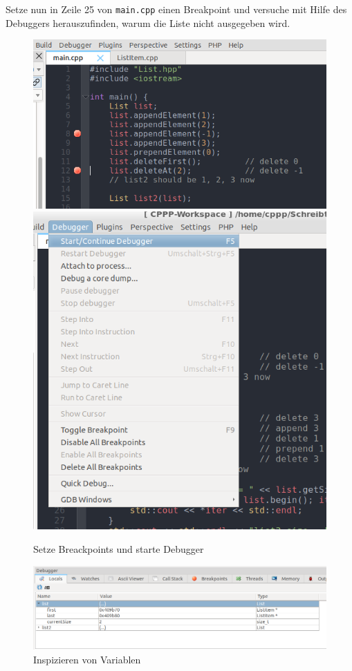  
Setze nun in Zeile 25 von \lstinline{main.cpp} einen Breakpoint und versuche mit Hilfe des Debuggers herauszufinden, warum die Liste nicht ausgegeben wird.
%
\begin{figure}
	\centering
	\includegraphics[width=.6\textwidth]{02_memory/figures/breakpoints.png}
	\includegraphics[width=.3\textwidth]{02_memory/figures/start_debugger.png}
	\caption{Setze Breackpoints und starte Debugger}
	\label{fig:breakpoints}
\end{figure}


\begin{figure}
	\centering
	\includegraphics[width=.9\textwidth]{02_memory/figures/locals_view.png}
	\caption{Inspizieren von Variablen}
	\label{fig:locals_view}
\end{figure}


